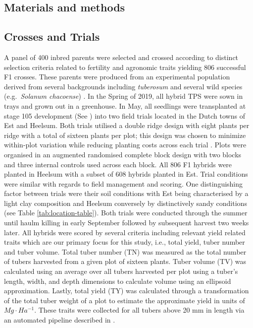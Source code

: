 \begin{refsection}
\section{Materials and methods}
\label{sec:materials:methods}

\subsection{Crosses and Trials}

A panel of 400 inbred parents were selected and crossed according to distinct selection criteria related to fertility and agronomic traits yielding 806 successful F1 crosses. These parents were produced from an experimental population derived from several backgrounds including \emph{tuberosum} and several wild species (e.g.~\emph{Solanum chacoense}) \parencite{Lindhout2018}. In the Spring of 2019, all hybrid TPS were sown in trays and grown out in a greenhouse. In May, all seedlings were transplanted at stage 105 development (See \parencite{Kacheyo2021}) into two field trials located in the Dutch towns of Est and Heelsum. Both trials utilised a double ridge design with eight plants per ridge with a total of sixteen plants per plot; this design was chosen to minimize within-plot variation while reducing planting costs across each trial \parencite{Stockem2021}. Plots were organised in an augmented randomised complete block design with two blocks and three internal controls used across each block. All 806 F1 hybrids were planted in Heelsum with a subset of 608 hybrids planted in Est. Trial conditions were similar with regards to field management and scoring. One distinguishing factor between trials were their soil conditions with Est being characterised by a light clay composition and Heelsum conversely by distinctively sandy conditions (see Table \ref{tab:location-table}). Both trials were conducted through the summer until haulm killing in early September followed by subsequent harvest two weeks later. All hybrids were scored by several criteria including relevant yield related traits which are our primary focus for this study, i.e., total yield, tuber number and tuber volume. Total tuber number (TN) was measured as the total number of tubers harvested from a given plot of sixteen plants. Tuber volume (TV) was calculated using an average over all tubers harvested per plot using a tuber's length, width, and depth dimensions to calculate volume using an ellipsoid approximation. Lastly, total yield (TY) was calculated through a transformation of the total tuber weight of a plot to estimate the approximate yield in units of \(Mg \cdot Ha^{-1}\). These traits were collected for all tubers above 20 mm in length via an automated pipeline described in \parencite{Stockem2020}.


\end{refsection}
